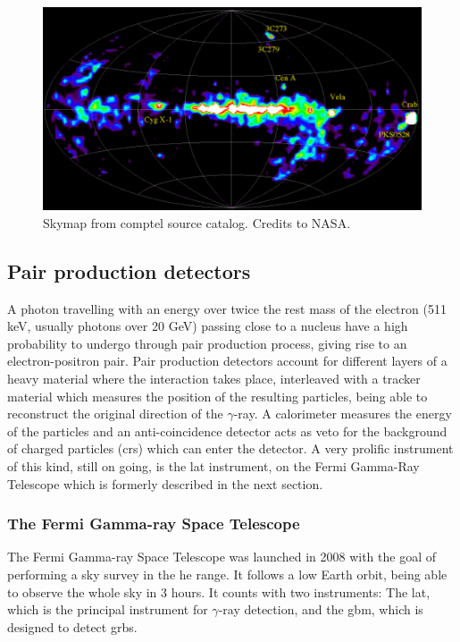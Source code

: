 \documentclass[main.tex]{subfiles}
\begin{document}
\begin{figure}
\centering
 \includegraphics[width=1\textwidth]{Pictures/comptel.pdf}
  \caption{Skymap from \gls{comptel} source catalog. Credits to NASA.}
    \label{fig:comptel}
\end{figure}

\subsection{Pair production detectors} \label{sec:pairprod}

A photon travelling with an energy over twice the rest mass of the electron (511 keV, usually photons over 20 GeV) passing close to a nucleus have a high probability to undergo through pair production process, giving rise to an electron-positron pair.
Pair production detectors account for different layers of a heavy material where the interaction takes place,  interleaved with a tracker material which measures the position of the resulting particles, being able to reconstruct the original direction of the $\gamma$-ray. A calorimeter measures the energy of the particles and an anti-coincidence detector acts as veto for the background of charged particles (\glspl{cr}) which can enter the detector. A very prolific instrument of this kind, still on going, is the \gls{lat} instrument, on the Fermi Gamma-Ray Telescope which is formerly described in the next section.

\subsubsection{The Fermi Gamma-ray Space Telescope} \label{sec:fermi}

The Fermi Gamma-ray Space Telescope was launched in 2008 with the goal of performing a sky survey in the \gls{he} range. It follows a low Earth orbit, being able to observe the whole sky in 3 hours. It counts with two instruments: The \gls{lat}, which is the principal instrument for $\gamma$-ray detection, and the \gls{gbm}, which is designed to detect \glspl{grb}.\\
\end{document}

